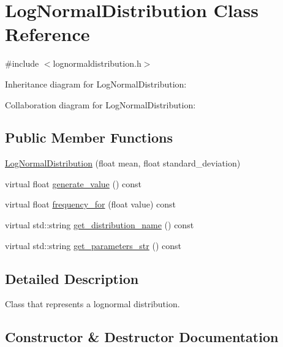 \hypertarget{classLogNormalDistribution}{}\section{Log\+Normal\+Distribution Class Reference}
\label{classLogNormalDistribution}


{\ttfamily \#include $<$lognormaldistribution.\+h$>$}



Inheritance diagram for Log\+Normal\+Distribution\+:


Collaboration diagram for Log\+Normal\+Distribution\+:
\subsection*{Public Member Functions}
\begin{DoxyCompactItemize}
\item 
\hyperlink{classLogNormalDistribution_a002e474d56d9a3d7204642fcf8bb9a46}{Log\+Normal\+Distribution} (float mean, float standard\+\_\+deviation)
\item 
virtual float \hyperlink{classLogNormalDistribution_a02ed860dc4f556df25e9274cd106937c}{generate\+\_\+value} () const
\item 
virtual float \hyperlink{classLogNormalDistribution_ab60a8974eaed392159b794994ed20999}{frequency\+\_\+for} (float value) const
\item 
virtual std\+::string \hyperlink{classLogNormalDistribution_a05e474accd65f523749011fbc8b42b65}{get\+\_\+distribution\+\_\+name} () const
\item 
virtual std\+::string \hyperlink{classLogNormalDistribution_a5dfd7c43d883d868dab5d62e55a7e610}{get\+\_\+parameters\+\_\+str} () const
\end{DoxyCompactItemize}


\subsection{Detailed Description}
Class that represents a lognormal distribution. 

\subsection{Constructor \& Destructor Documentation}
\mbox{\label{classLogNormalDistribution_a002e474d56d9a3d7204642fcf8bb9a46}} 
